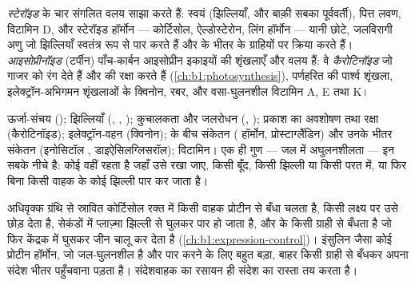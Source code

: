 \begin{definition}[स्टेरॉइड, आइसोप्रीनॉइड]\label{def:b1:lipids:steroids}
\emph{स्टेरॉइड}  के चार संगलित वलय साझा
करते हैं: स्वयं  (झिल्लियाँ, और बाक़ी सबका पूर्ववर्ती), पित्त
लवण, विटामिन D, और स्टेरॉइड हॉर्मोन --- कोर्टिसोल, ऐल्डोस्टेरोन,
लिंग हॉर्मोन --- यानी छोटे, जलविरागी अणु जो झिल्लियाँ स्वतंत्र रूप से
पार करते हैं और  के भीतर के ग्राहियों पर क्रिया करते हैं।
\emph{आइसोप्रीनॉइड}
(टर्पीन) पाँच-कार्बन आइसोप्रीन इकाइयों की शृंखलाएँ और वलय हैं: वे
\emph{कैरोटिनॉइड} जो गाजर को रंग देते हैं और  की रक्षा करते हैं
(\cref{ch:b1:photosynthesis}), पर्णहरित की पार्श्व शृंखला,
इलेक्ट्रॉन-अभिगमन शृंखलाओं के क्विनोन, रबर, और वसा-घुलनशील
विटामिन A, E तथा K।
\end{definition}

\begin{proposition}[लिपिड क्या करते हैं]\label{prop:b1:lipids:functions}
ऊर्जा-संचय (); झिल्लियाँ (, ,
); कुचालकता और जलरोधन (, ); प्रकाश का अवशोषण तथा रक्षा
(कैरोटिनॉइड); इलेक्ट्रॉन-वहन (क्विनोन);  के बीच संकेतन
( हॉर्मोन, प्रोस्टाग्लैंडिन) और उनके भीतर संकेतन
(इनोसिटॉल , डाइऐसिलग्लिसरॉल); विटामिन। एक ही गुण ---
जल में अघुलनशीलता --- इन सबके नीचे है: कोई  वहीं रहता है जहाँ उसे
रखा जाए, किसी बूँद, किसी झिल्ली या किसी परत में, या फिर बिना किसी वाहक के
कोई झिल्ली पार कर जाता है।
\end{proposition}

\begin{example}[वह हॉर्मोन जिसे सतह पर ग्राही नहीं चाहिए]\label{ex:b1:lipids:steroidhormone}
अधिवृक्क ग्रंथि से स्रावित कोर्टिसोल रक्त में किसी वाहक प्रोटीन से बँधा
चलता है, किसी लक्ष्य  पर उसे छोड़ देता है, सेकंडों में प्लाज़्मा
झिल्ली से घुलकर पार हो जाता है, और  के किसी ग्राही से बँधता है
जो फिर केंद्रक में घुसकर जीन चालू कर देता है
(\cref{ch:b1:expression-control})। इंसुलिन जैसा कोई प्रोटीन हॉर्मोन, जो
जल-घुलनशील है और पार करने के लिए बहुत बड़ा, बाहर किसी ग्राही से बँधकर
अपना संदेश भीतर पहुँचवाना पड़ता है। संदेशवाहक का रसायन ही संदेश का
रास्ता तय करता है।
\end{example}

